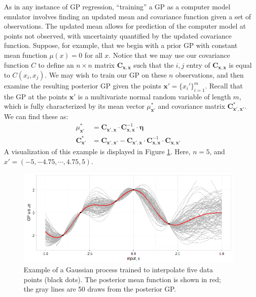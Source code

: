 \documentclass{article}
\begin{document}
As in any instance of GP regression, ``training'' a GP as a computer model emulator involves finding an updated mean and covariance function given a set of observations. The updated mean allows for prediction of the computer model at points not observed, with uncertainty quantified by the updated covariance function.
Suppose, for example, that we begin with a prior GP with constant mean function $\mu(x)=0$ for all $x$. Notice that we may use our covariance function $C$ to define an $n\times n$ matrix $\mathbf C_{\mathbf x,\mathbf x}$ such that the $i,j$ entry of $\mathbf C_{\mathbf x,\mathbf x}$ is equal to $C(x_i,x_j)$. We may wish to train our GP on these $n$ observations, and then examine the resulting posterior GP given the points $\mathbf x'=\{x_i' \}_{i=1}^m$. Recall that the GP at the points $\mathbf x'$ is a multivariate normal random variable of length $m$, which is fully characterized by its mean vector $\mu^*_{\mathbf x'}$ and covariance matrix $\mathbf C^*_{\mathbf x',\mathbf x'}$. We can find these as:
\begin{equation}\label{eq:post_gp}\begin{split}
\mu^*_{\mathbf x'}&=\mathbf C_{\mathbf x',\mathbf x}\cdot \mathbf C_{\mathbf x,\mathbf x} ^{-1}\cdot \boldsymbol \eta
\\
\mathbf C^*_{\mathbf x'}&=\mathbf C_{\mathbf x',\mathbf x'}-\mathbf C_{\mathbf x',\mathbf x}\cdot \mathbf C_{\mathbf x,\mathbf x}^{-1}\cdot \mathbf C_{\mathbf x,\mathbf x'}
\end{split}\end{equation}
A visualization of this example is displayed in Figure \ref{fig:gp_example}. Here, $n=5$, and $x'=(-5,-4.75,\cdots,4.75,5)$. 

\begin{figure}[h]
\centering
\includegraphics[width=.75\linewidth]{gp_example}
\captionsetup{width=.7\linewidth}
\caption{Example of a Gaussian process trained to interpolate five data points (black dots). The posterior mean function is shown in red; the gray lines are 50 draws from the posterior GP.}
\label{fig:gp_example}
\end{figure}
\end{document}
